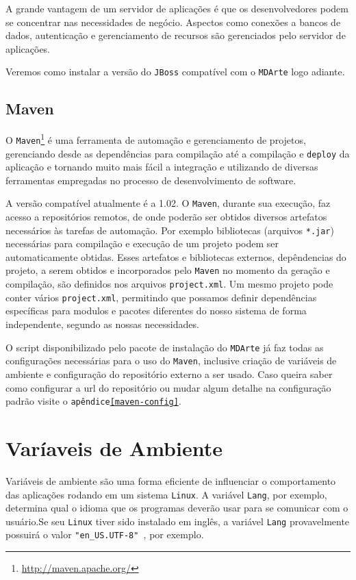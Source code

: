 A grande vantagem de um servidor de aplicações é que os desenvolvedores podem se
concentrar nas necessidades de negócio. Aspectos como conexões a bancos de
dados, autenticação e gerenciamento de recursos são gerenciados pelo servidor de
aplicações.

Veremos como instalar a versão do \texttt{JBoss} compatível com o
\texttt{MDArte} logo adiante.

\subsection{Maven}
O
\texttt{Maven}\footnote{\href{http://maven.apache.org/}{http://maven.apache.org/}}
é uma ferramenta de automação e gerenciamento de projetos, gerenciando desde as
dependências para compilação até a compilação e \texttt{deploy} da aplicação e
tornando muito mais fácil a integração e utilizando de diversas ferramentas
empregadas no processo de desenvolvimento de software.

A versão compatível atualmente é a 1.02. O \texttt{Maven}, durante sua execução,
faz acesso a repositórios remotos, de onde poderão ser obtidos diversos artefatos
necessários às tarefas de automação. Por exemplo bibliotecas (arquivos
\texttt{*.jar}) necessárias para compilação e execução de um projeto podem ser
automaticamente obtidas. Esses artefatos e bibliotecas externos, depêndencias do
projeto, a serem obtidos e incorporados pelo \texttt{Maven} no momento da
geração e compilação, são definidos nos arquivos \texttt{project.xml}. Um mesmo
projeto pode conter vários \texttt{project.xml}, permitindo que possamos definir
dependências específicas para modulos e pacotes diferentes do nosso sistema de
forma independente, segundo as nossas necessidades.

O script disponibilizado pelo pacote de instalação do \texttt{MDArte} já faz
todas as configurações necessárias para o uso do \texttt{Maven}, inclusive
criação de variáveis de ambiente e configuração do repositório externo a ser
usado. Caso queira saber como configurar a url do repositório ou mudar algum
detalhe na configuração padrão visite o \texttt{apêndice\ref{maven-config}}.

\section{Varíaveis de Ambiente}

Variáveis de ambiente são uma forma eficiente de influenciar o comportamento das
aplicações rodando em um sistema \texttt{Linux}. A variável \texttt{Lang}, por
exemplo, determina qual o idioma que os programas deverão usar para se comunicar
com o usuário.Se seu \texttt{Linux} tiver sido instalado em inglês, a variável \texttt{Lang}
provavelmente possuirá o valor \texttt{"en\_US.UTF-8" }, por exemplo.

